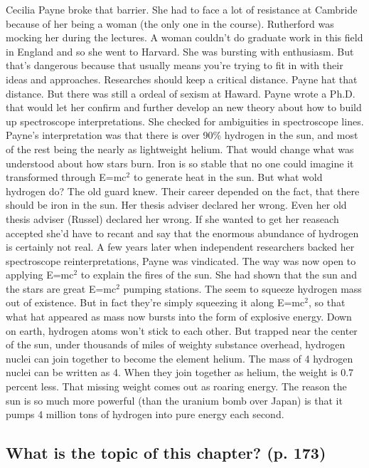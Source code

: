 Cecilia Payne broke that barrier. She had to face a lot of resistance at Cambride because of her being a woman (the only one in the course). Rutherford was mocking her during the lectures. A woman couldn't do graduate work in this field in England and so she went to Harvard. She was bursting with enthusiasm. But that's dangerous because that usually means you're trying to fit in with their ideas and approaches. Researches should keep a critical distance. Payne hat that distance. But there was still a ordeal of sexism at Haward. 
Payne wrote a Ph.D. that would let her confirm and further develop an new theory about how to build up spectroscope interpretations.
She checked for ambiguities in spectroscope lines.
Payne's interpretation was that there is over 90\% hydrogen in the sun, and most of the rest being the nearly as lightweight helium.
That would change what was understood about how stars burn. Iron is so stable that no one could imagine it transformed through E=mc$^2$ to generate heat in the sun. But what wold hydrogen do? The old guard knew. Their career depended on the fact, that there should be iron in the sun. Her thesis adviser declared her wrong. Even her old thesis adviser (Russel) declared her wrong. If she wanted to get her reaseach accepted she'd have to recant and say that the enormous abundance of hydrogen is certainly not real. A few years later when independent researchers backed her spectroscope reinterpretations, Payne was vindicated.
The way was now open to applying E=mc$^2$ to explain the fires of the sun. She had shown that the sun and the stars are great E=mc$^2$ pumping stations. The seem to squeeze hydrogen mass out of existence. But in fact they're simply squeezing it along E=mc$^2$, so that what hat appeared as mass now bursts into the form of explosive energy.
Down on earth, hydrogen atoms won't stick to each other. But trapped near the center of the sun, under thousands of miles of weighty substance overhead, hydrogen nuclei can join together to become the element helium.
The mass of 4 hydrogen nuclei can be written as 4. When they join together as
helium, the weight is 0.7 percent less. That missing weight comes out as roaring energy. The reason the sun is so much more powerful (than the uranium bomb over Japan) is that it pumps 4 million tons of hydrogen into pure energy each second.


\subsection*{What is the topic of this chapter? (p. 173)}

